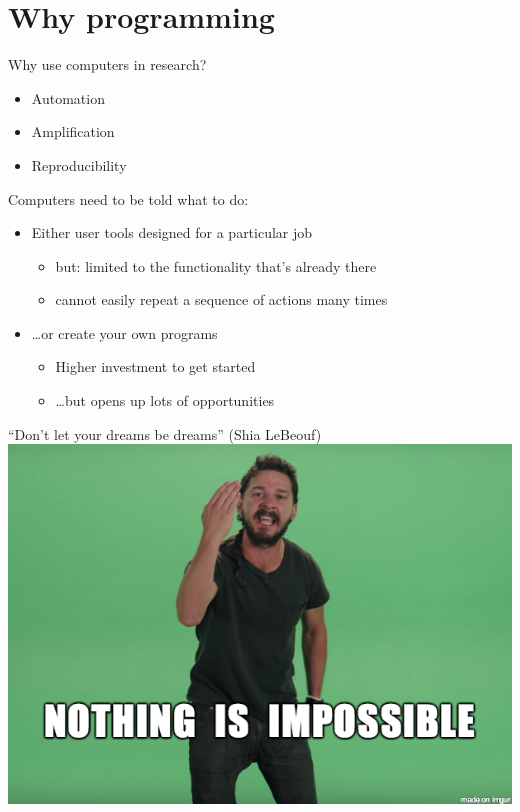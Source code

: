 \documentclass{beamer}
\begin{document}
\section{Why programming}
\begin{frame}
	Why use computers in research?
	\begin{itemize}
		\item Automation
		\item Amplification
		\item Reproducibility
	\end{itemize}
\end{frame}

\begin{frame}
	Computers need to be told what to do:

	\begin{itemize}
	\item Either user tools designed for a particular job
		\begin{itemize}
			\item but: limited to the functionality that's already there
			\item cannot easily repeat a sequence of actions many times
		\end{itemize}

	\item \dots or create your own programs
		\begin{itemize}
			\item Higher investment to get started
			\item \dots but opens up lots of opportunities
		\end{itemize}
	\end{itemize}
\end{frame}

\begin{frame}{``Don't let your dreams be dreams'' (Shia LeBeouf)}
    \includegraphics[width=\textwidth]{fig/nothingisimpossible}
\end{frame}
\end{document}
